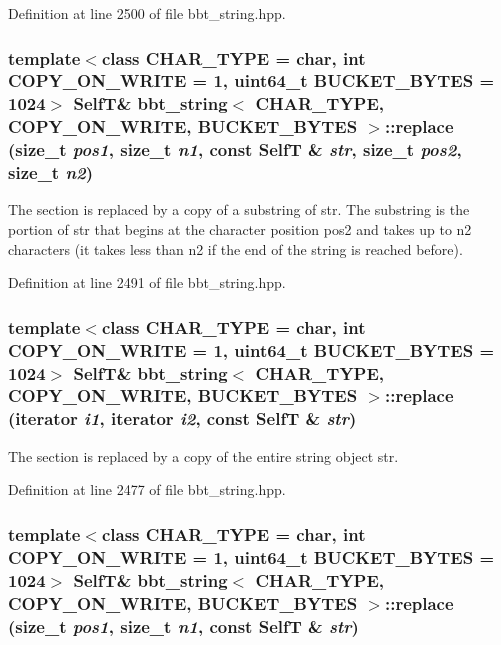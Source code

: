 Definition at line 2500 of file bbt\_\-string.hpp.\hypertarget{classbbt__string_56380b00db98648281e47a98db7877b9}{
\subsubsection[{replace}]{\setlength{\rightskip}{0pt plus 5cm}template$<$class CHAR\_\-TYPE  = char, int COPY\_\-ON\_\-WRITE = 1, uint64\_\-t BUCKET\_\-BYTES = 1024$>$ {\bf SelfT}\& {\bf bbt\_\-string}$<$ CHAR\_\-TYPE, COPY\_\-ON\_\-WRITE, BUCKET\_\-BYTES $>$::replace (size\_\-t {\em pos1}, \/  size\_\-t {\em n1}, \/  const {\bf SelfT} \& {\em str}, \/  size\_\-t {\em pos2}, \/  size\_\-t {\em n2})}}
\label{classbbt__string_56380b00db98648281e47a98db7877b9}


The section is replaced by a copy of a substring of str. The substring is the portion of str that begins at the character position pos2 and takes up to n2 characters (it takes less than n2 if the end of the string is reached before). 

Definition at line 2491 of file bbt\_\-string.hpp.\hypertarget{classbbt__string_51dbd7d4611fe6d60c4238786281d25e}{
\subsubsection[{replace}]{\setlength{\rightskip}{0pt plus 5cm}template$<$class CHAR\_\-TYPE  = char, int COPY\_\-ON\_\-WRITE = 1, uint64\_\-t BUCKET\_\-BYTES = 1024$>$ {\bf SelfT}\& {\bf bbt\_\-string}$<$ CHAR\_\-TYPE, COPY\_\-ON\_\-WRITE, BUCKET\_\-BYTES $>$::replace (iterator {\em i1}, \/  iterator {\em i2}, \/  const {\bf SelfT} \& {\em str})}}
\label{classbbt__string_51dbd7d4611fe6d60c4238786281d25e}


The section is replaced by a copy of the entire string object str. 

Definition at line 2477 of file bbt\_\-string.hpp.\hypertarget{classbbt__string_e00ce88ee9fb5e57bdd03b293752cd1a}{
\subsubsection[{replace}]{\setlength{\rightskip}{0pt plus 5cm}template$<$class CHAR\_\-TYPE  = char, int COPY\_\-ON\_\-WRITE = 1, uint64\_\-t BUCKET\_\-BYTES = 1024$>$ {\bf SelfT}\& {\bf bbt\_\-string}$<$ CHAR\_\-TYPE, COPY\_\-ON\_\-WRITE, BUCKET\_\-BYTES $>$::replace (size\_\-t {\em pos1}, \/  size\_\-t {\em n1}, \/  const {\bf SelfT} \& {\em str})}}
\label{classbbt__string_e00ce88ee9fb5e57bdd03b293752cd1a}


